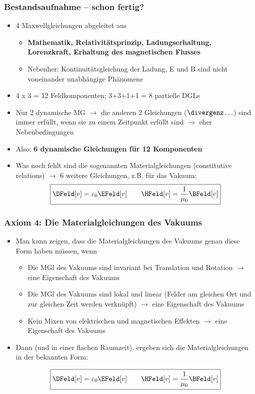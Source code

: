\begin{frame}
  \frametitle{Bestandsaufnahme -- schon fertig?}
\begin{itemize}[<+->]
\item  4 Maxwellgleichungen abgeleitet aus
\begin{itemize}[<+->]
\item  \textbf{Mathematik, Relativitätsprinzip, Ladungserhaltung, Lorenzkraft, Erhaltung des magnetischen Flusses}
\item Nebenher: Kontinuitätsgleichung der Ladung, E und B sind nicht voneinander unabhängige Phänomene 
\end{itemize}
\item 4 x 3 = 12 Feldkomponenten; 3+3+1+1 = 8 partielle DGLs
\item Nur 2 dynamische MG \(\to\) die anderen 2 Gleichungen (\(\divergenz \ldots\)) sind immer erfüllt, wenn sie zu einem Zeitpunkt erfüllt sind \(\to\) eher Nebenbedingungen
\item Also: \textbf{6 dynamische Gleichungen für 12 Komponenten} 
\item Was noch fehlt sind die sogenannten Materialgleichungen (constitutive relations) \(\to\) 6 weitere Gleichungen, z.B. für das Vakuum:
  \begin{equation*}
    \boxed{\DFeld[v] = \varepsilon_0\EFeld[v] \qquad
    \HFeld[v] = \frac{1}{\mu_0} \BFeld[v]}
    \end{equation*}
\end{itemize}
\end{frame}


\begin{frame}
  \frametitle{Axiom 4: Die Materialgleichungen des Vakuums}
\begin{itemize}[<+->]
\item  Man kann zeigen, dass die Materialgleichungen des Vakuums genau diese Form haben müssen, wenn

\begin{itemize}[<+->]
\item  Die MGl des Vakuums sind invariant bei Translation und Rotation \(\to\) eine Eigenschaft des Vakuums
\item Die MGl des Vakuums sind lokal und linear (Felder am gleichen Ort und zur gleichen Zeit werden verknüpft) \(\to\) eine Eigenschaft des Vakuums
\item Kein Mixen von elektrischen und magnetischen Effekten \(\to\) eine Eigenschaft des Vakuums
\end{itemize}
\item Dann (und in einer flachen Raumzeit), ergeben sich die Materialgleichungen in der bekannten Form:

  \begin{equation*}
    \boxed{\DFeld[v] = \varepsilon_0\EFeld[v] \qquad
    \HFeld[v] = \frac{1}{\mu_0} \BFeld[v]}
    \end{equation*}
\end{itemize}
\end{frame}

